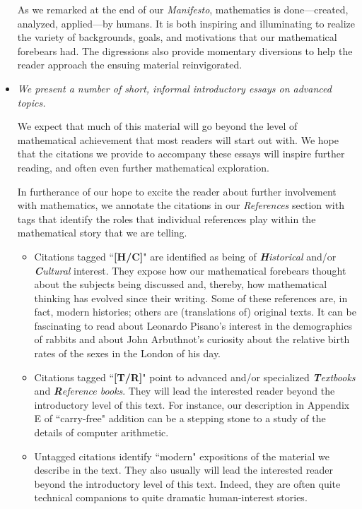 \begin{itemize}
\smallskip

As we remarked at the end of our {\it Manifesto}, mathematics is done---created, analyzed, applied---by humans.  It is both inspiring and illuminating to realize the variety of backgrounds, goals, and motivations that our mathematical forebears had.  The digressions also provide momentary diversions to help the reader approach the ensuing material reinvigorated.

\medskip\item
{\em We present a number of short, informal introductory essays on advanced topics.}

\smallskip

We expect that much of this material will go beyond the level of mathematical achievement that most readers will start out with.  We hope that the citations we provide to accompany these essays will inspire further reading, and often even further mathematical exploration.

\smallskip

In furtherance of our hope to excite the reader about further involvement with mathematics, we annotate the citations in our {\it References} section with tags that identify the roles that individual references play within the mathematical story that we are telling.
  \begin{itemize}
  \item
Citations tagged ``{\bf [H/C]}" are identified as being of {\em {\bf H}istorical} and/or 
{\em {\bf C}ultural} interest.  They expose how our mathematical forebears thought about the subjects being discussed and, thereby, how mathematical thinking has evolved since their writing.  Some of these references are, in fact, modern histories; others are (translations of) original texts.  It can be fascinating to read about Leonardo Pisano's interest in the demographics of rabbits and about John Arbuthnot's curiosity about the relative birth rates of the sexes in the London of his day.

  \item
Citations tagged ``{\bf [T/R]}" point to advanced and/or specialized {\em {\bf T}extbooks} and {\em {\bf R}eference books}.  They will lead the interested reader beyond the introductory level of this text.  For instance, our description in Appendix E of ``carry-free" addition can be a stepping stone to a study of the details of computer arithmetic.

  \item
Untagged citations identify ``modern" expositions of the material we describe in the text.  They also usually will lead the interested reader beyond the introductory level of this text.  Indeed, they are often quite technical companions to quite dramatic human-interest stories.
  \end{itemize}


\end{itemize}

